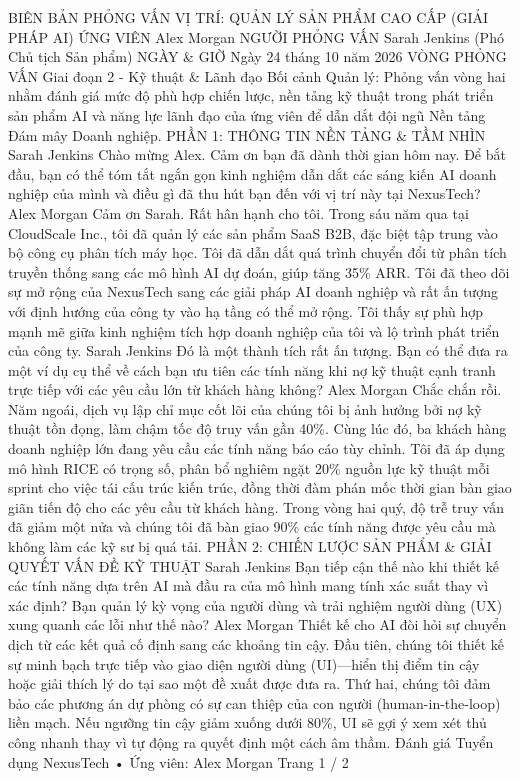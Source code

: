 BIÊN BẢN PHỎNG VẤN
VỊ TRÍ: QUẢN LÝ SẢN PHẨM CAO CẤP (GIẢI PHÁP AI)
ỨNG VIÊN
Alex Morgan
NGƯỜI PHỎNG VẤN
Sarah Jenkins (Phó Chủ tịch Sản phẩm)
NGÀY \& GIỜ
Ngày 24 tháng 10 năm 2026
VÒNG PHỎNG VẤN
Giai đoạn 2 - Kỹ thuật \& Lãnh đạo
Bối cảnh Quản lý: Phỏng vấn vòng hai nhằm đánh giá mức độ phù hợp chiến lược, nền tảng kỹ thuật trong phát triển sản phẩm AI và năng lực lãnh đạo của ứng viên để dẫn dắt đội ngũ Nền tảng Đám mây Doanh nghiệp.
PHẦN 1: THÔNG TIN NỀN TẢNG \& TẦM NHÌN
Sarah Jenkins
Chào mừng Alex. Cảm ơn bạn đã dành thời gian hôm nay. Để bắt đầu, bạn có thể tóm tắt ngắn gọn kinh nghiệm dẫn dắt các sáng kiến AI doanh nghiệp của mình và điều gì đã thu hút bạn đến với vị trí này tại NexusTech?
Alex Morgan
Cảm ơn Sarah. Rất hân hạnh cho tôi. Trong sáu năm qua tại CloudScale Inc., tôi đã quản lý các sản phẩm SaaS B2B, đặc biệt tập trung vào bộ công cụ phân tích máy học. Tôi đã dẫn dắt quá trình chuyển đổi từ phân tích truyền thống sang các mô hình AI dự đoán, giúp tăng 35\% ARR. Tôi đã theo dõi sự mở rộng của NexusTech sang các giải pháp AI doanh nghiệp và rất ấn tượng với định hướng của công ty vào hạ tầng có thể mở rộng. Tôi thấy sự phù hợp mạnh mẽ giữa kinh nghiệm tích hợp doanh nghiệp của tôi và lộ trình phát triển của công ty.
Sarah Jenkins
Đó là một thành tích rất ấn tượng. Bạn có thể đưa ra một ví dụ cụ thể về cách bạn ưu tiên các tính năng khi nợ kỹ thuật cạnh tranh trực tiếp với các yêu cầu lớn từ khách hàng không?
Alex Morgan
Chắc chắn rồi. Năm ngoái, dịch vụ lập chỉ mục cốt lõi của chúng tôi bị ảnh hưởng bởi nợ kỹ thuật tồn đọng, làm chậm tốc độ truy vấn gần 40\%. Cùng lúc đó, ba khách hàng doanh nghiệp lớn đang yêu cầu các tính năng báo cáo tùy chỉnh. Tôi đã áp dụng mô hình RICE có trọng số, phân bổ nghiêm ngặt 20\% nguồn lực kỹ thuật mỗi sprint cho việc tái cấu trúc kiến trúc, đồng thời đàm phán mốc thời gian bàn giao giãn tiến độ cho các yêu cầu từ khách hàng. Trong vòng hai quý, độ trễ truy vấn đã giảm một nửa và chúng tôi đã bàn giao 90\% các tính năng được yêu cầu mà không làm các kỹ sư bị quá tải.
PHẦN 2: CHIẾN LƯỢC SẢN PHẨM \& GIẢI QUYẾT VẤN ĐỀ KỸ THUẬT
Sarah Jenkins
Bạn tiếp cận thế nào khi thiết kế các tính năng dựa trên AI mà đầu ra của mô hình mang tính xác suất thay vì xác định? Bạn quản lý kỳ vọng của người dùng và trải nghiệm người dùng (UX) xung quanh các lỗi như thế nào?
Alex Morgan
Thiết kế cho AI đòi hỏi sự chuyển dịch từ các kết quả cố định sang các khoảng tin cậy. Đầu tiên, chúng tôi thiết kế sự minh bạch trực tiếp vào giao diện người dùng (UI)—hiển thị điểm tin cậy hoặc giải thích lý do tại sao một đề xuất được đưa ra. Thứ hai, chúng tôi đảm bảo các phương án dự phòng có sự can thiệp của con người (human-in-the-loop) liền mạch. Nếu ngưỡng tin cậy giảm xuống dưới 80\%, UI sẽ gợi ý xem xét thủ công nhanh thay vì tự động ra quyết định một cách âm thầm.
Đánh giá Tuyển dụng NexusTech • Ứng viên: Alex Morgan
Trang 1 / 2

